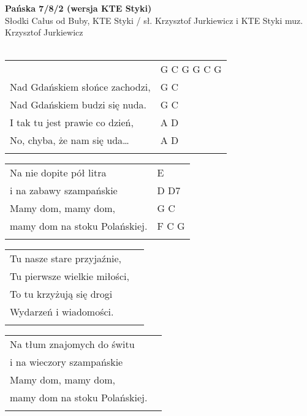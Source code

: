 \documentclass[a5paper]{article}
\begin{document}


\noindent
\fontsize{12pt}{15pt}\selectfont
\textbf{Pańska 7/8/2 (wersja KTE Styki)} \\
\fontsize{8pt}{10pt}\selectfont
Słodki Całus od Buby, KTE Styki / sł. Krzysztof Jurkiewicz i KTE Styki muz. Krzysztof Jurkiewicz \\ \\
\fontsize{10pt}{12pt}\selectfont
{}
\begin{tabular}{@{}p{7.50cm}p{3cm}@{}}
\noindent
& G C G  G C G \\
Nad Gdańskiem słońce zachodzi, & G C \\
Nad Gdańskiem budzi się nuda. & G C \\
I tak tu jest prawie co dzień, & A D \\
No, chyba, że nam się uda… & A D \\ \\
\end{tabular}

\noindent
\begin{tabular}{@{}p{6.50cm}p{3cm}@{}}
	Na nie dopite pół litra & E \\
	i na zabawy szampańskie & D D7 \\
	Mamy dom, mamy dom, & G C \\
	mamy dom na stoku Polańskiej. & F C G \\ \\
\end{tabular}

\noindent
\begin{tabular}{@{}p{6.10cm}p{3cm}@{}}
Tu nasze stare przyjaźnie, \\
Tu pierwsze wielkie miłości, \\
To tu krzyżują się drogi \\
Wydarzeń i wiadomości. \\ \\
\end{tabular}

\noindent
\begin{tabular}{@{}p{6.60cm}p{3cm}@{}}
Na tłum znajomych do świtu \\
i na wieczory szampańskie \\
Mamy dom, mamy dom, \\
mamy dom na stoku Polańskiej. \\ \\
\end{tabular}
\end{document}
